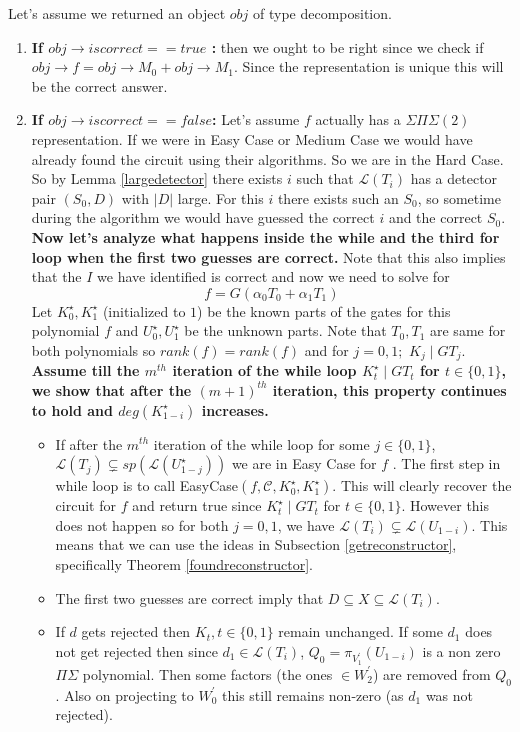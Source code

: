 \documentclass[letterpaper,USenglish,numberwithinsect]{lipics}
\newcommand{\ML}{\mathcal{L}}
\newcommand{\MC}{\mathcal{C}}
\begin{document}
Let's assume we returned an object $obj$ of type decomposition.
\begin{enumerate}
 \item {\bf If $obj\rightarrow iscorrect ==true$ :} then we ought to be right since we check if
 $obj\rightarrow f=obj\rightarrow M_0 + obj\rightarrow M_1$. Since the representation is unique
this will be the correct answer.

 \item {\bf If $obj\rightarrow iscorrect ==false$:} Let's assume $f$ actually has a $\Sigma\Pi\Sigma(2)$
 representation. If we were in Easy Case or Medium Case we would have already found the circuit using their algorithms.
 So we are in the Hard Case. So by Lemma \ref{largedetector} there exists $i$ such that $\ML(T_i)$ has a detector pair $(S_0,D)$
 with $|D|$ large. For this $i$ there exists such an $S_0$, so sometime during the algorithm we would have guessed the correct $i$ and
 the correct $S_0$. {\bf Now let's analyze what happens inside the while and the third for loop when the first two guesses are correct.}
 Note that
 this also implies that the $I$ we have identified is correct and now we need to solve for
 \[
  f = G(\alpha_0 T_0 + \alpha_1 T_1)
 \]
  Let $K_0^\star,K_1^\star$ (initialized to $1$) be the known parts of the gates for this polynomial $f$ and
  $U_0^\star,U_1^\star$ be the unknown parts.
  Note that $T_0,T_1$ are same for both polynomials so $rank(f) = rank(f)$ and for $j=0,1;$ $K_j\mid G T_j$.\\

  {\bf Assume till the $m^{th}$ iteration of the while loop $K_{t}^\star \mid G T_{t}$ for $t\in \{0,1\}$, we show that after the $(m+1)^{th}$
  iteration, this property continues to hold and $deg(K_{1-i}^\star)$ increases.}

 \begin{itemize}
  \item  If after the $m^{th}$ iteration of the while loop for some $j\in \{0,1\}$, $\ML(T_j)\subsetneq sp(\ML(U_{1-j}^\star))$
  we are in Easy Case for $f$ . The first step in while loop is to call EasyCase$(f,\MC,K_0^\star,K_1^\star)$.
  This will clearly recover the circuit for $f$ and return true since $K_{t}^\star \mid G T_{t}$ for $t\in \{0,1\}$.
  However this does not happen so for both $j=0,1$, we have $\ML(T_i)\subsetneq \ML(U_{1-i})$. This means that we can use
  the ideas in Subsection \ref{getreconstructor}, specifically Theorem \ref{foundreconstructor}.
  \item The first two guesses are correct imply that $D\subseteq X\subseteq \ML(T_i)$.
  \item If $d$ gets rejected then $K_t, t\in\{0,1\}$ remain unchanged. If some $d_1$ does not get rejected then since
  $d_1\in \ML(T_i)$, $Q_0 = \pi_{V_1^\prime}(U_{1-i})$ is a non zero $\Pi\Sigma$ polynomial. Then some factors (the ones $\in W_2^\prime$) are
  removed from $Q_0$. Also on projecting to $W_0^\prime$ this
  still remains non-zero (as $d_1$ was not rejected).


\end{itemize}
\end{enumerate}
\end{document}
